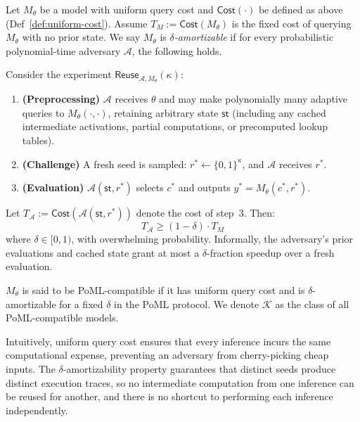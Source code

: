 \begin{definition}
\label{def:delta-reuse}
Let $M_\theta$ be a model with uniform query cost and $\mathsf{Cost}(\cdot)$ be defined as above (Def~\ref{def:uniform-cost}). Assume $T_M:=\mathsf{Cost}(M_\theta)$ is the fixed cost of querying $M_\theta$ with no prior state. We say $M_\theta$ is \emph{$\delta$-amortizable} if for every probabilistic polynomial-time adversary $\mathcal{A}$, the following holds.

Consider the experiment $\textsf{Reuse}_{\mathcal{A}, M_\theta}(\kappa)$:
\begin{enumerate}
    \item \textbf{(Preprocessing)} $\mathcal{A}$ receives $\theta$ and may make polynomially many adaptive queries to $M_\theta(\cdot, \cdot)$, retaining arbitrary state $\textsf{st}$ (including any cached intermediate activations, partial computations, or precomputed lookup tables).
    \item \textbf{(Challenge)} A fresh seed is sampled: $r^* \leftarrow \{0,1\}^\kappa$, and $\mathcal{A}$ receives $r^*$.
    \item \textbf{(Evaluation)} $\mathcal{A}(\textsf{st}, r^*)$ selects $c^*$ and outputs $y^* = M_\theta(c^*, r^*)$.
\end{enumerate}

Let $T_{\mathcal{A}}:= \mathsf{Cost}(\mathcal{A}(\textsf{st}, r^*))$ denote the cost of step~3. Then:
\begin{equation}
    T_{\mathcal{A}} \geq (1 - \delta) \cdot T_M
\end{equation}
where $\delta \in [0, 1)$, with overwhelming probability. Informally, the adversary's prior evaluations and cached state grant at most a $\delta$-fraction speedup over a fresh evaluation.
\end{definition}


\begin{definition}
\label{def:model}
$M_\theta$ is said to be PoML-compatible if it has uniform query cost and is $\delta$-amortizable for a fixed $\delta$ in the PoML protocol. We denote $\mathcal{K}$ as the class of all PoML-compatible models.
\end{definition}

Intuitively, uniform query cost ensures that every inference incurs the same computational expense, preventing an adversary from cherry-picking cheap inputs. The $\delta$-amortizability property guarantees that distinct seeds produce distinct execution traces, so no intermediate computation from one inference can be reused for another, and there is no shortcut to performing each inference independently.

